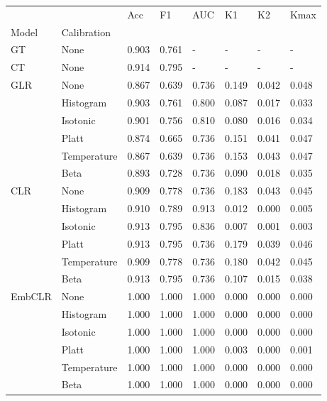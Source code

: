 \begin{tabular}{llllllll}
\toprule
 &  & Acc & F1 & AUC & K1 & K2 & Kmax \\
Model & Calibration &  &  &  &  &  &  \\
\midrule
GT & None & 0.903 & 0.761 & - & - & - & - \\
\cline{1-8}
CT & None & 0.914 & 0.795 & - & - & - & - \\
\cline{1-8}
\multirow[t]{6}{*}{GLR} & None & 0.867 & 0.639 & 0.736 & 0.149 & 0.042 & 0.048 \\
 & Histogram & 0.903 & 0.761 & 0.800 & 0.087 & 0.017 & 0.033 \\
 & Isotonic & 0.901 & 0.756 & 0.810 & 0.080 & 0.016 & 0.034 \\
 & Platt & 0.874 & 0.665 & 0.736 & 0.151 & 0.041 & 0.047 \\
 & Temperature & 0.867 & 0.639 & 0.736 & 0.153 & 0.043 & 0.047 \\
 & Beta & 0.893 & 0.728 & 0.736 & 0.090 & 0.018 & 0.035 \\
\cline{1-8}
\multirow[t]{6}{*}{CLR} & None & 0.909 & 0.778 & 0.736 & 0.183 & 0.043 & 0.045 \\
 & Histogram & 0.910 & 0.789 & 0.913 & 0.012 & 0.000 & 0.005 \\
 & Isotonic & 0.913 & 0.795 & 0.836 & 0.007 & 0.001 & 0.003 \\
 & Platt & 0.913 & 0.795 & 0.736 & 0.179 & 0.039 & 0.046 \\
 & Temperature & 0.909 & 0.778 & 0.736 & 0.180 & 0.042 & 0.045 \\
 & Beta & 0.913 & 0.795 & 0.736 & 0.107 & 0.015 & 0.038 \\
\cline{1-8}
\multirow[t]{6}{*}{EmbCLR} & None & 1.000 & 1.000 & 1.000 & 0.000 & 0.000 & 0.000 \\
 & Histogram & 1.000 & 1.000 & 1.000 & 0.000 & 0.000 & 0.000 \\
 & Isotonic & 1.000 & 1.000 & 1.000 & 0.000 & 0.000 & 0.000 \\
 & Platt & 1.000 & 1.000 & 1.000 & 0.003 & 0.000 & 0.001 \\
 & Temperature & 1.000 & 1.000 & 1.000 & 0.000 & 0.000 & 0.000 \\
 & Beta & 1.000 & 1.000 & 1.000 & 0.000 & 0.000 & 0.000 \\
\cline{1-8}
\bottomrule
\end{tabular}
